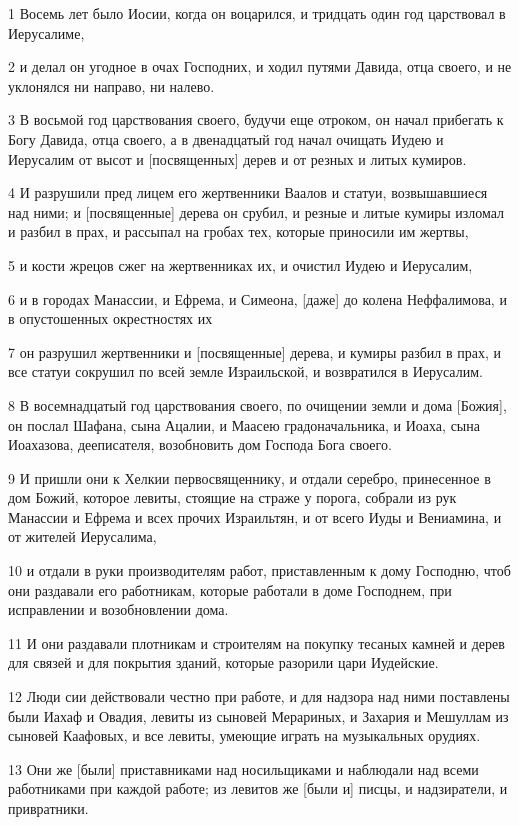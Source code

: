 \par 1 Восемь лет было Иосии, когда он воцарился, и тридцать один год царствовал в Иерусалиме,
\par 2 и делал он угодное в очах Господних, и ходил путями Давида, отца своего, и не уклонялся ни направо, ни налево.
\par 3 В восьмой год царствования своего, будучи еще отроком, он начал прибегать к Богу Давида, отца своего, а в двенадцатый год начал очищать Иудею и Иерусалим от высот и [посвященных] дерев и от резных и литых кумиров.
\par 4 И разрушили пред лицем его жертвенники Ваалов и статуи, возвышавшиеся над ними; и [посвященные] дерева он срубил, и резные и литые кумиры изломал и разбил в прах, и рассыпал на гробах тех, которые приносили им жертвы,
\par 5 и кости жрецов сжег на жертвенниках их, и очистил Иудею и Иерусалим,
\par 6 и в городах Манассии, и Ефрема, и Симеона, [даже] до колена Неффалимова, и в опустошенных окрестностях их
\par 7 он разрушил жертвенники и [посвященные] дерева, и кумиры разбил в прах, и все статуи сокрушил по всей земле Израильской, и возвратился в Иерусалим.
\par 8 В восемнадцатый год царствования своего, по очищении земли и дома [Божия], он послал Шафана, сына Ацалии, и Маасею градоначальника, и Иоаха, сына Иоахазова, дееписателя, возобновить дом Господа Бога своего.
\par 9 И пришли они к Хелкии первосвященнику, и отдали серебро, принесенное в дом Божий, которое левиты, стоящие на страже у порога, собрали из рук Манассии и Ефрема и всех прочих Израильтян, и от всего Иуды и Вениамина, и от жителей Иерусалима,
\par 10 и отдали в руки производителям работ, приставленным к дому Господню, чтоб они раздавали его работникам, которые работали в доме Господнем, при исправлении и возобновлении дома.
\par 11 И они раздавали плотникам и строителям на покупку тесаных камней и дерев для связей и для покрытия зданий, которые разорили цари Иудейские.
\par 12 Люди сии действовали честно при работе, и для надзора над ними поставлены были Иахаф и Овадия, левиты из сыновей Мерариных, и Захария и Мешуллам из сыновей Каафовых, и все левиты, умеющие играть на музыкальных орудиях.
\par 13 Они же [были] приставниками над носильщиками и наблюдали над всеми работниками при каждой работе; из левитов же [были и] писцы, и надзиратели, и привратники.
